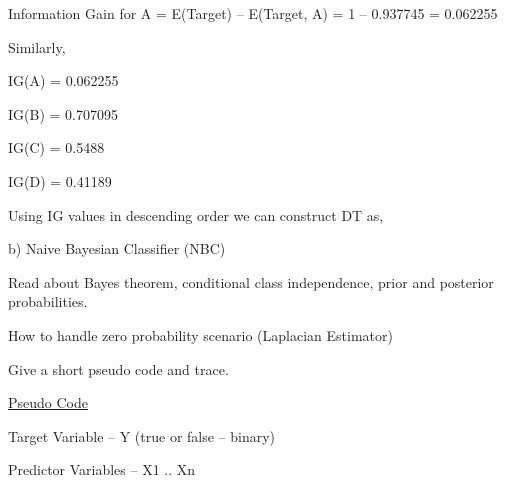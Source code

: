 \documentclass[12pt]{article}
\renewcommand{\_}{\kern-1.5pt\textunderscore\kern-1.5pt}
\begin{document}
Information Gain for A = E(Target) – E(Target, A) = 1 – 0.937745 = 0.062255\par

Similarly, \par

IG(A) = 0.062255\par

IG(B) = 0.707095\par

IG(C) = 0.5488\par

IG(D) = 0.41189\par

Using IG values in descending order we can construct DT as,\par


\vspace{\baselineskip}
\vspace{\baselineskip}

\vspace{\baselineskip}
\begin{Center}
{\fontsize{18pt}{21.6pt}\selectfont b) Naive Bayesian Classifier (NBC)\par}
\end{Center}\par


\vspace{\baselineskip}
{\fontsize{14pt}{16.8pt}\selectfont Read about Bayes theorem, conditional class independence, prior and posterior probabilities.\par}\par

{\fontsize{14pt}{16.8pt}\selectfont How to handle zero probability scenario (Laplacian Estimator)\par}\par

{\fontsize{14pt}{16.8pt}\selectfont Give a short pseudo code and trace.\par}\par

{\fontsize{14pt}{16.8pt}\selectfont \uline{Pseudo Code}\par}\par

Target Variable – Y (true or false -- binary)\par

Predictor Variables – X1 .. Xn\par
\end{document}
